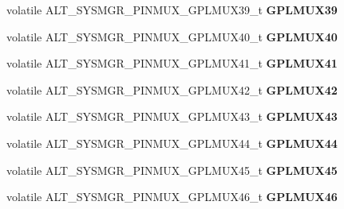 \begin{DoxyCompactItemize}
volatile A\+L\+T\+\_\+\+S\+Y\+S\+M\+G\+R\+\_\+\+P\+I\+N\+M\+U\+X\+\_\+\+G\+P\+L\+M\+U\+X39\+\_\+t {\bfseries G\+P\+L\+M\+U\+X39}
\item 
\mbox{\label{structALT__SYSMGR__PINMUX__s_ab0cd72a00859d8be181f2fb09e4a8150}} 
volatile A\+L\+T\+\_\+\+S\+Y\+S\+M\+G\+R\+\_\+\+P\+I\+N\+M\+U\+X\+\_\+\+G\+P\+L\+M\+U\+X40\+\_\+t {\bfseries G\+P\+L\+M\+U\+X40}
\item 
\mbox{\label{structALT__SYSMGR__PINMUX__s_ada4776954897787c091be48cea950ad3}} 
volatile A\+L\+T\+\_\+\+S\+Y\+S\+M\+G\+R\+\_\+\+P\+I\+N\+M\+U\+X\+\_\+\+G\+P\+L\+M\+U\+X41\+\_\+t {\bfseries G\+P\+L\+M\+U\+X41}
\item 
\mbox{\label{structALT__SYSMGR__PINMUX__s_ae6907f940ace6bfa1402d013f7b6abd4}} 
volatile A\+L\+T\+\_\+\+S\+Y\+S\+M\+G\+R\+\_\+\+P\+I\+N\+M\+U\+X\+\_\+\+G\+P\+L\+M\+U\+X42\+\_\+t {\bfseries G\+P\+L\+M\+U\+X42}
\item 
\mbox{\label{structALT__SYSMGR__PINMUX__s_a4ffd2263655cb03f64922db6e0e92074}} 
volatile A\+L\+T\+\_\+\+S\+Y\+S\+M\+G\+R\+\_\+\+P\+I\+N\+M\+U\+X\+\_\+\+G\+P\+L\+M\+U\+X43\+\_\+t {\bfseries G\+P\+L\+M\+U\+X43}
\item 
\mbox{\label{structALT__SYSMGR__PINMUX__s_a850b1efd3fb6c786366c4a0f6e3fc6fa}} 
volatile A\+L\+T\+\_\+\+S\+Y\+S\+M\+G\+R\+\_\+\+P\+I\+N\+M\+U\+X\+\_\+\+G\+P\+L\+M\+U\+X44\+\_\+t {\bfseries G\+P\+L\+M\+U\+X44}
\item 
\mbox{\label{structALT__SYSMGR__PINMUX__s_a3a4a3967754bfe5c240a451a896bd856}} 
volatile A\+L\+T\+\_\+\+S\+Y\+S\+M\+G\+R\+\_\+\+P\+I\+N\+M\+U\+X\+\_\+\+G\+P\+L\+M\+U\+X45\+\_\+t {\bfseries G\+P\+L\+M\+U\+X45}
\item 
\mbox{\label{structALT__SYSMGR__PINMUX__s_a5f4841c92c69244dc754c18a67afaecc}} 
volatile A\+L\+T\+\_\+\+S\+Y\+S\+M\+G\+R\+\_\+\+P\+I\+N\+M\+U\+X\+\_\+\+G\+P\+L\+M\+U\+X46\+\_\+t {\bfseries G\+P\+L\+M\+U\+X46}
\item 
\mbox{\label{structALT__SYSMGR__PINMUX__s_ad7725b605be401a46f65758a4788e74a}} 

\end{DoxyCompactItemize}
